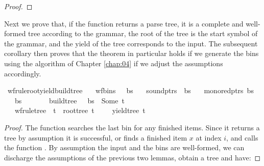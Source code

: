 \begin{isabellebody}
\begin{isamarkuptext}
\begin{proof}
\end{proof}%
\end{isamarkuptext}\isamarkuptrue%
%
\begin{isamarkuptext}%
Next we prove that, if the function  returns a parse tree, it is a complete and
well-formed tree according to the grammar, the root of the tree is the start symbol of the grammar,
and the yield of the tree corresponds to the input. The subsequent corollary then proves that the theorem
in particular holds if we generate the bins using the algorithm of Chapter \ref{chap:04} if we adjust
the assumptions accordingly.%
\end{isamarkuptext}\isamarkuptrue%
\isamarkupfalse%
\ wf{\isacharunderscore}{\kern0pt}rule{\isacharunderscore}{\kern0pt}root{\isacharunderscore}{\kern0pt}yield{\isacharunderscore}{\kern0pt}build{\isacharunderscore}{\kern0pt}tree{\isacharcolon}{\kern0pt}\isanewline
\ \ \ {\isachardoublequoteopen}wf{\isacharunderscore}{\kern0pt}bins\ {\isasymG}\ {\isasymomega}\ bs{\isachardoublequoteclose}\isanewline
\ \ \ {\isachardoublequoteopen}sound{\isacharunderscore}{\kern0pt}ptrs\ {\isasymomega}\ bs{\isachardoublequoteclose}\isanewline
\ \ \ {\isachardoublequoteopen}mono{\isacharunderscore}{\kern0pt}red{\isacharunderscore}{\kern0pt}ptrs\ bs{\isachardoublequoteclose}\isanewline
\ \ \ {\isachardoublequoteopen}{\isacharbar}{\kern0pt}bs{\isacharbar}{\kern0pt}\ {\isacharequal}{\kern0pt}\ {\isacharbar}{\kern0pt}{\isasymomega}{\isacharbar}{\kern0pt}\ {\isacharplus}{\kern0pt}\ {}{\isachardoublequoteclose}\isanewline
\ \ \ {\isachardoublequoteopen}build{\isacharunderscore}{\kern0pt}tree\ {\isasymG}\ {\isasymomega}\ bs\ {\isacharequal}{\kern0pt}\ Some\ t{\isachardoublequoteclose}\isanewline
\ \ \ {\isachardoublequoteopen}wf{\isacharunderscore}{\kern0pt}rule{\isacharunderscore}{\kern0pt}tree\ {\isasymG}\ t\ {\isasymand}\ root{\isacharunderscore}{\kern0pt}tree\ t\ {\isacharequal}{\kern0pt}\ {\isasymSS}\ {\isasymG}\ {\isasymand}\ yield{\isacharunderscore}{\kern0pt}tree\ t\ {\isacharequal}{\kern0pt}\ {\isasymomega}{\isachardoublequoteclose}%
\isadelimproof
%
\endisadelimproof
%
\isatagproof
%
\endisatagproof
{\isafoldproof}%
%
\isadelimproof
%
\endisadelimproof
%
\begin{isamarkuptext}%
\begin{proof}

The function  searches the last bin for any finished items. Since it returns
a tree by assumption it is successful, or finds a finished item $x$ at index $i$, and calls
the function . By assumption the input and the bins are
well-formed, we can discharge the assumptions of the previous two lemmas, obtain a tree  and have:


\end{proof}
\end{isamarkuptext}
\end{isabellebody}
